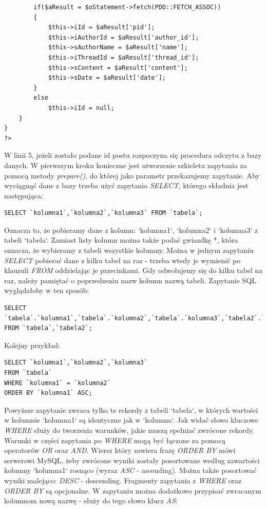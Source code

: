 \documentclass[a4paper,10pt]{article}
\begin{document}
\begin{verbatim}
		if($aResult = $oStatement->fetch(PDO::FETCH_ASSOC))
		{
			$this->iId = $aResult['pid'];
			$this->iAuthorId = $aResult['author_id'];
			$this->sAuthorName = $aResult['name'];
			$this->iThreadId = $aResult['thread_id'];
			$this->sContent = $aResult['content'];
			$this->sDate = $aResult['date'];
		}
		else
			$this->iId = null;
	}
}
?>
\end{verbatim}
W linii 5, jeżeli zostało podane id postu rozpoczyna się procedura odczytu z bazy danych. W pierwszym kroku konieczne jest utworzenie szkieletu zapytania za pomocą metody \textit{prepare()}, do której jako parametr przekazujemy zapytanie. Aby wyciągnąć dane z bazy trzeba użyć zapytania \textit{SELECT}, którego składnia jest następująca:\\
\begin{verbatim}
SELECT `kolumna1`,`kolumna2`,`kolumna3` FROM `tabela`;
\end{verbatim}
Oznacza to, że pobieramy dane z kolumn: `kolumna1`, `kolumna2` i `kolumna3` z tabeli `tabela`. Zamiast listy kolumn można także podać gwiazdkę *, która oznacza, że wybieramy z tabeli wszystkie kolumny. Można w jednym zapytaniu \textit{SELECT} pobierać dane z kilku tabel na raz - trzeba wtedy je wymienić po klauzuli \textit{FROM} oddzielając je przecinkami. Gdy odwołujemy się do kilku tabel na raz, należy pamiętać o poprzedzeniu nazw kolumn nazwą tabeli. Zapytanie SQL wyglądałoby w ten sposób: \\
\begin{verbatim}
SELECT `tabela`.`kolumna1`,`tabela`.`kolumna2`,`tabela`.`kolumna3`,`tabela2`.`kolumna5`
FROM `tabela`,`tabela2`;
\end{verbatim}
Kolejny przykład: \\
\begin{verbatim}
SELECT `kolumna1`,`kolumna2`,`kolumna3`
FROM `tabela`
WHERE `kolumna1` = `kolumna2`
ORDER BY `kolumna1` ASC;
\end{verbatim}
Powyższe zapytanie zwraca tylko te rekordy z tabeli `tabela`, w których wartości w kolumnie `kolumna1` są identyczne jak w `kolumna`. Jak widać słowo kluczowe \textit{WHERE} służy do tworzenia warunków, jakie muszą spełniać zwrócone rekordy. Warunki w części zapytania po \textit{WHERE} mogą być łączone za pomocą operatorów \textit{OR} oraz \textit{AND}. Wiersz który zawiera frazę \textit{ORDER BY} mówi serwerowi MySQL, żeby zwrócone wyniki zostały posortowane według zawartości kolumny `kolumna1` rosnąco (wyraz \textit{ASC} - ascending). Można także posortować wyniki malejąco: \textit{DESC} - descending. Fragmenty zapytania z \textit{WHERE} oraz \textit{ORDER BY} są opcjonalne. W zapytaniu można dodatkowo przypisać zwracanym kolumnom nową nazwę - służy do tego słowo klucz \textit{AS}: \\
\end{document}
